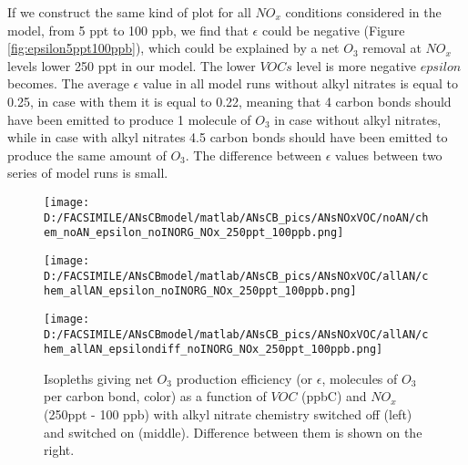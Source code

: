\documentclass[11pt,a4paper]{article}
\begin{document}
If we construct the same kind of plot for all $NO_x$ conditions considered in the model, from 5 ppt to 100 ppb, we find that $\epsilon$ could be negative (Figure \ref{fig:epsilon5ppt100ppb}), which could be explained by a net $O_3$ removal at $NO_x$ levels lower 250 ppt in our model. The lower $VOCs$ level is more negative $epsilon$ becomes. The average $\epsilon$ value in all model runs without alkyl nitrates is equal to 0.25, in case with them it is equal to 0.22, meaning that 4 carbon bonds should have been emitted to produce 1 molecule of $O_3$ in case without alkyl nitrates, while in case with alkyl nitrates 4.5 carbon bonds should have been emitted to produce the same amount of $O_3$. The difference between $\epsilon$ values between two series of model runs is small.

\begin{figure} %
\centering
\begin{minipage}{.3\textwidth}
  \centering
  \texttt{[image: D:/FACSIMILE/ANsCBmodel/matlab/ANsCB\_pics/ANsNOxVOC/noAN/chem\_noAN\_epsilon\_noINORG\_NOx\_250ppt\_100ppb.png]}
\end{minipage}
\begin{minipage}{.3\textwidth}
  \centering
  \texttt{[image: D:/FACSIMILE/ANsCBmodel/matlab/ANsCB\_pics/ANsNOxVOC/allAN/chem\_allAN\_epsilon\_noINORG\_NOx\_250ppt\_100ppb.png]}
\end{minipage}
\begin{minipage}{.3\textwidth}
  \centering
  \texttt{[image: D:/FACSIMILE/ANsCBmodel/matlab/ANsCB\_pics/ANsNOxVOC/allAN/chem\_allAN\_epsilondiff\_noINORG\_NOx\_250ppt\_100ppb.png]}
\end{minipage}
\caption{Isopleths giving net $O_3$ production efficiency (or $\epsilon$, molecules of $O_3$ per carbon bond, color) as a function of $VOC$ (ppbC) and $NO_x$ (250ppt - 100 ppb) with alkyl nitrate chemistry switched off (left) and switched on (middle). Difference between them is shown on the right.}\label{fig:epsilon250ppt100ppb}
\end{figure}
\end{document}
